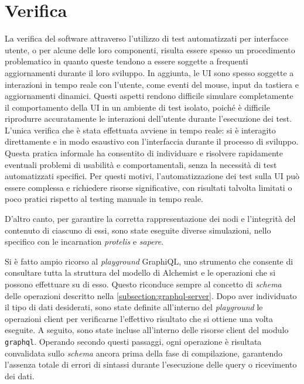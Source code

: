 \section{Verifica}
La verifica del software attraverso l'utilizzo di test automatizzati per interfacce utente, o per alcune delle loro componenti, risulta essere spesso un procedimento problematico in quanto queste tendono a essere soggette a frequenti aggiornamenti durante il loro sviluppo. In aggiunta, le \ac{UI} sono spesso soggette  a interazioni in tempo reale con l'utente, come eventi del mouse, input da tastiera e aggiornamenti dinamici. Questi aspetti rendono difficile simulare completamente il comportamento della \ac{UI} in un ambiente di test isolato, poiché è difficile riprodurre accuratamente le interazioni dell'utente durante l'esecuzione dei test. L'unica verifica che è stata effettuata avviene in tempo reale: si è interagito direttamente e in modo esaustivo con l'interfaccia durante il processo di sviluppo. Questa pratica informale ha consentito di individuare e risolvere rapidamente eventuali problemi di usabilità e comportamentali, senza la necessità di test automatizzati specifici. 
Per questi motivi, l'automatizzazione dei test sulla UI può essere complessa e richiedere risorse significative, con risultati talvolta limitati o poco pratici rispetto al testing manuale in tempo reale.

D'altro canto, per garantire la corretta rappresentazione dei nodi e l'integrità del contenuto di ciascuno di essi, sono state eseguite diverse simulazioni, nello specifico con le incarnation \textit{protelis} e \textit{sapere}.

Si è fatto ampio ricorso al \textit{playground} GraphiQL, uno strumento che consente di consultare tutta la struttura del modello di Alchemist e le operazioni che si possono effettuare su di esso. Questo riconduce sempre al concetto di \textit{schema} delle operazioni descritto nella \cref{subsection:graphql-server}. 
Dopo aver individuato il tipo di dati desiderati, sono state definite all'interno del \textit{playground} le operazioni client per verificarne l’effettivo risultato che si ottiene una volta eseguite. 
A seguito, sono state incluse all’interno delle risorse client del modulo \texttt{graphql}. 
Operando secondo questi passaggi, ogni operazione è risultata convalidata sullo \textit{schema} ancora prima della fase di compilazione, garantendo l'assenza totale di errori di sintassi durante l'esecuzione delle query o ricevimento dei dati. 





